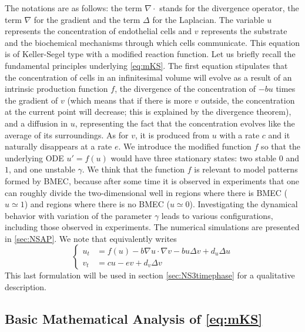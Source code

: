 \documentclass[final,1p,times]{elsarticle}
\begin{document}
The notations are as follows: the  term $\nabla \cdot $ stands for the divergence operator, the  term $\nabla$ for the gradient and the term $\Delta$ for the Laplacian. The variable $u$ represents the concentration of endothelial cells and $v$ represents the substrate and the biochemical mechanisms through which cells communicate. This equation is of Keller-Segel type with a modified reaction function. Let us briefly recall the fundamental principles underlying \eqref{eq:mKS}. The first equation stipulates that the concentration of cells in an infinitesimal volume will evolve as a result of an intrinsic production function $f$, the divergence of the concentration of $-bu$ times the gradient of $v$ (which means that if there is more $v$ outside, the concentration at the current point will decrease; this is explained by the divergence theorem), and a diffusion in $u$, representing the fact that the concentration evolves like the average of its surroundings. As for $v$, it is produced from $u$ with a rate $c$ and it naturally disappears at a rate $e$. We introduce the modified function $f$ so that the underlying ODE $u'=f(u)$ would have three stationary states: two stable $0$ and $1$, and one unstable $\gamma$. We think that the function $f$ is relevant to model patterns formed by BMEC, because after some time it is observed in experiments that one can roughly divide the two-dimensional well in regions where there is BMEC ($u\simeq 1$) and regions where there is no BMEC ($u\simeq 0$). Investigating the dynamical behavior with variation of the parameter $\gamma$ leads to various configurations, including those observed in experiments. The numerical simulations are presented in \cref{sec:NSAP}. We note that  equivalently writes
\begin{equation}
\left\{
    \begin{array}{rl}
         u_t&=f(u)-b\nabla u \cdot \nabla v-bu\Delta v+d_u\Delta u  \\
         v_t&=cu-ev+d_v\Delta v 
    \end{array}
    \right.
    \label{eq:mKSbis}
\end{equation}
This last formulation will be used in section \ref{sec:NS3timephase} for a qualitative description.
\subsection{Basic Mathematical Analysis of \cref{eq:mKS}}
\end{document}
